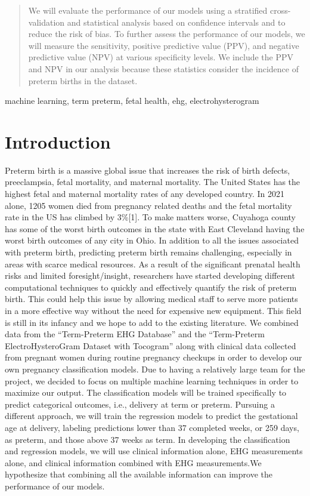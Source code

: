 \documentclass[conference]{IEEEtran}
\begin{document}
\begin{abstract}
	We will evaluate the performance of our models using a stratified cross-validation and statistical analysis based on confidence intervals and to reduce the risk of bias.
	To further assess the performance of our models, we will measure the sensitivity, positive predictive value (PPV), and negative predictive value (NPV) at various specificity levels. We include the PPV and NPV in our analysis because these statistics consider the incidence of preterm births in the dataset.

\end{abstract}

\begin{IEEEkeywords}
	machine learning, term preterm, fetal health, ehg, electrohysterogram
\end{IEEEkeywords}

\section{Introduction}
Preterm birth is a massive global issue that increases the risk of birth defects, preeclampsia, fetal mortality, and maternal mortality. The United States has the highest fetal and maternal mortality rates of any developed country. In 2021 alone, 1205 women died from pregnancy related deaths and the fetal mortality rate in the US has climbed by 3\%[1]. To make matters worse, Cuyahoga county has some of the worst birth outcomes in the state with East Cleveland having the worst birth outcomes of any city in Ohio. In addition to all the issues associated with preterm birth, predicting preterm birth remains challenging, especially in areas with scarce medical resources.
As a result of the significant prenatal health risks and limited foresight/insight, researchers have started developing different computational techniques to quickly and effectively quantify the risk of preterm birth. This could help this issue by allowing medical staff to serve more patients in a more effective way without the need for expensive new equipment. This field is still in its infancy and we hope to add to the existing literature.
We combined data from the “Term-Preterm EHG Database”  and the “Term-Preterm ElectroHysteroGram Dataset with Tocogram” along with clinical data collected from pregnant women during routine pregnancy checkups in order to develop our own pregnancy classification models. Due to having a relatively large team for the project, we decided to focus on multiple machine learning techniques in order to maximize our output. The classification models will be trained specifically to predict categorical outcomes, i.e., delivery at term or preterm. Pursuing a different approach, we will train the regression models to predict the gestational age at delivery, labeling predictions lower than 37 completed weeks, or 259 days, as preterm, and those above 37 weeks as term. In developing the classification and regression models, we will use clinical information alone, EHG measurements alone, and clinical information combined with EHG measurements.We hypothesize that combining all the available information can improve the performance of our models.
\end{document}
